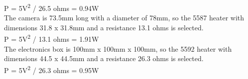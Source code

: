 P = 5V\textsuperscript{2} / 26.5 ohms = 0.94W\\

The camera is 73.5mm long with a diameter of 78mm, so the 5587 heater with dimensions 31.8 x 31.8mm and a resistance 13.1 ohms is selected.\\

P = 5V\textsuperscript{2} / 13.1 ohms = 1.91W\\

The electronics box is 100mm x 100mm x 100mm, so the 5592 heater with dimensions 44.5 x 44.5mm and a resistance 26.3 ohms is selected.\\

P = 5V\textsuperscript{2} / 26.3 ohms = 0.95W\\

\label{sec:4.6.5}

